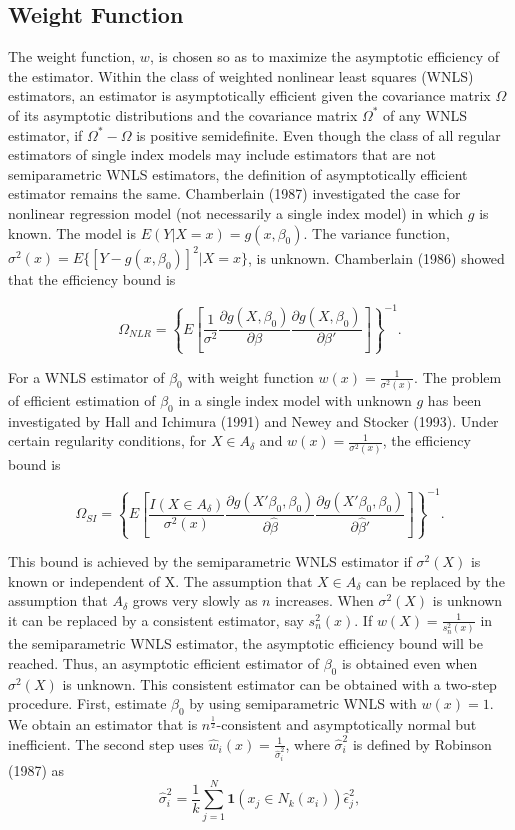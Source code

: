 \documentclass[a4paper]{article}
\begin{document}
\subsection{Weight Function} %
\label{sub:Weight Function}

The weight function, $w$, is chosen so as to maximize the asymptotic efficiency of the estimator. Within the class of weighted nonlinear least squares (WNLS) estimators, an estimator is asymptotically efficient given the covariance matrix $\Omega$ of its asymptotic distributions and the covariance matrix $\Omega^*$ of any WNLS estimator, if $\Omega^* - \Omega$ is positive semidefinite. Even though the class of all regular estimators of single index models may include estimators that are not semiparametric WNLS estimators, the definition of asymptotically efficient estimator remains the same. Chamberlain (1987) investigated the case for nonlinear regression model (not necessarily a single index model) in which $g$ is known. The model is $E(Y|X = x) = g(x, \beta_0)$. The variance function, $\sigma^2(x) = E\{[Y - g(x, \beta_0)]^2| X = x\}$, is unknown. Chamberlain (1986) showed that the efficiency bound is 

\[ \Omega_{NLR} = \left\{E\left[\frac{1}{\sigma^2}\frac{\partial g(X, \beta_0)}{\partial \beta} \frac{\partial g(X, \beta_0)}{\partial \beta'}\right]\right\}^{-1}. \]

For a WNLS estimator of $\beta_0$ with weight function $w(x) = \frac{1}{\sigma^2(x)}$. The problem of efficient estimation of $\beta_0$ in a single index model with unknown $g$ has been investigated by Hall and Ichimura (1991) and Newey and Stocker (1993). Under certain regularity conditions, for $X \in A_{\delta}$ and $w(x) = \frac{1}{\sigma^2(x)}$, the efficiency bound is

\begin{equation}
\Omega_{SI} = \left\{ E\left[\frac{I(X \in A_{\delta})}{\sigma^2(x)}\frac{\partial g(X'\beta_0, \beta_0)}{\partial \hat{\beta}}\frac{\partial g(X'\beta_0, \beta_0)}{\partial \hat{\beta}'}\right] \right\}^{-1}.
\end{equation}


This bound is achieved by the semiparametric WNLS estimator if $\sigma^2(X)$ is known or independent of X. The assumption that $X \in A_{\delta}$ can be replaced by the assumption that $A_{\delta}$ grows very slowly as $n$ increases. When $\sigma^2(X)$ is unknown it can be replaced by a consistent estimator, say $s_{n}^{2}(x)$. If $w(X) = \frac{1}{s_{n}^{2}(x)}$ in the semiparametric WNLS estimator, the asymptotic efficiency bound will be reached. Thus, an asymptotic efficient estimator of $\beta_0$ is obtained even when $\sigma^2(X)$ is unknown. This consistent estimator can be obtained with a two-step procedure. First, estimate $\beta_0$ by using semiparametric WNLS with $w(x) = 1$. We obtain an estimator that is $n^{\frac{1}{2}}$-consistent and asymptotically normal but inefficient. The second step uses $\hat{w}_i(x) = \frac{1}{\hat{\sigma}_{i}^{2}}$, where  $\hat{\sigma}_{i}^{2}$ is defined by Robinson (1987) as 
\[\hat{\sigma}_{i}^{2} = \frac{1}{k}\sum_{j=1}^{N} \mathbf{1}{(x_j \in N_k(x_i))}\hat{\epsilon}_{j}^{2} ,\]
\end{document}
